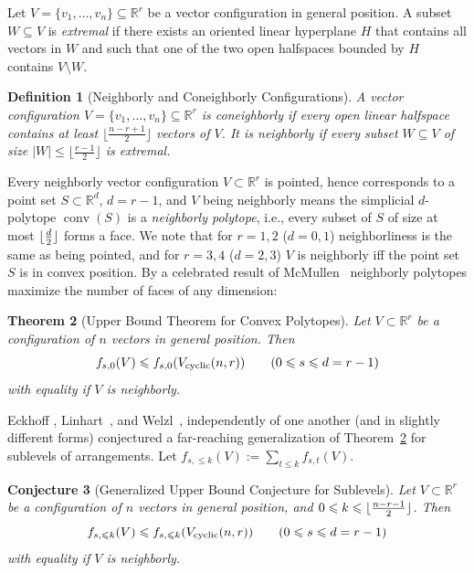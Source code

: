 \documentclass[11pt]{article}
\newtheorem{theorem}{Theorem}
\newtheorem{definition}[theorem]{Definition}
\newtheorem{conjecture}[theorem]{Conjecture}
\DeclareMathOperator{\conv}{conv}
\renewcommand{\leq}{\leqslant}
\newcommand{\R}{\mathbb{R}}
\DeclarePairedDelimiter\floor{\lfloor}{\rfloor}
\newcommand{\cyclic}{V_{\textup{cyclic}}}
\begin{document}
%
Let $V=\{v_1,\dots,v_n\} \subseteq \R^r$ be a vector configuration in general position. A subset $W\subseteq V$ is \emph{extremal} if there exists an oriented linear hyperplane $H$ that contains all vectors in $W$ and such that one of the two open halfspaces bounded by $H$ contains $V\setminus W$.
%
\begin{definition}[{Neighborly and Coneighborly Configurations}] A vector configuration 
$V=\{v_1,\dots,v_n\} \subseteq \R^r$ is \emph{coneighborly} if every open linear halfspace contains at least $\lfloor \frac{n-r+1}{2} \rfloor$ vectors of $V$. 
It is \emph{neighborly} if every subset $W \subseteq V$ of size $|W| \leq \lfloor \frac{r-1}{2} \rfloor$ is \emph{extremal}.
\end{definition}
Every neighborly vector configuration $V \subset \R^r$ is pointed, hence corresponds to a point set $S\subset \R^d$, $d=r-1$, and $V$ being neighborly means the simplicial $d$-polytope $\conv(S)$ is a \emph{neighborly polytope}, i.e., every subset of $S$ of size at most $\floor{\frac{d}{2}}$ forms a face. 
We note that for $r=1,2$ ($d=0,1$) neighborliness is the same as being pointed, and for $r=3,4$ ($d=2,3$) $V$ is neighborly iff the point set $S$ is in convex position. By a celebrated result of McMullen~\cite{McMullen:1970aa} neighborly polytopes maximize the number of faces of any dimension:
%
\begin{theorem}[Upper Bound Theorem for Convex Polytopes] 
\label{thm:UBT}
Let $V \subset \R^r$ be a configuration of $n$ vectors in general position. Then
\[
f_{s,0}(V) \leq f_{s,0}(\cyclic(n,r)) \qquad (0 \leq s \leq d=r-1)
\]
with equality if $V$ is neighborly.
\end{theorem}
Eckhoff \cite[Conj.~9.8]{Eckhoff:1993aa}, Linhart~\cite{Linhart:1994aa}, and Welzl~\cite{Welzl:2001aa}, independently of one another (and in slightly different forms) conjectured a far-reaching generalization of Theorem~\ref{thm:UBT} for sublevels of arrangements. Let $f_{s,\leq k}(V):=\sum_{t\leq k}f_{s,t}(V)$.
%
\begin{conjecture}[Generalized Upper Bound Conjecture for Sublevels]
\label{GUBC} 
Let $V \subset \R^r$ be a configuration of $n$ vectors in general position, and $0\leq k\leq \floor{\frac{n-r-1}{2}}$. Then 
\[f_{s,\leq k}(V) \leq f_{s,\leq k}(\cyclic(n,r)) \qquad (0 \leq s \leq d=r-1)\]
with equality if $V$ is neighborly.
\end{conjecture}
\end{document}
